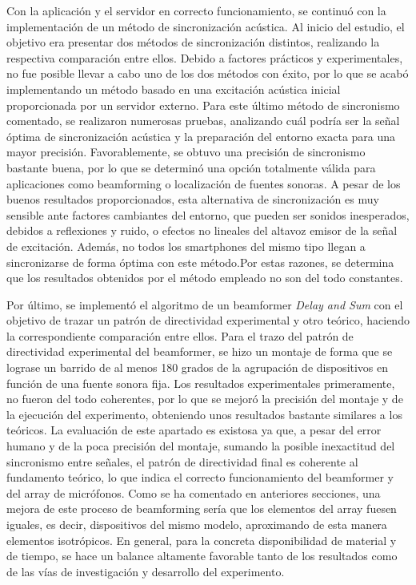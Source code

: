 \documentclass[a4paper,11pt]{book}
\begin{document}
Con la aplicación y el servidor en correcto funcionamiento, se continuó con la implementación de un método de sincronización acústica. Al inicio del estudio, el objetivo era presentar dos métodos de sincronización distintos, realizando la respectiva comparación entre ellos. Debido a factores prácticos y experimentales, no fue posible llevar a cabo uno de los dos métodos con éxito, por lo que se acabó implementando un método basado en una excitación acústica inicial proporcionada por un servidor externo. Para este último método de sincronismo comentado, se realizaron numerosas pruebas, analizando cuál podría ser la señal óptima de sincronización acústica y la preparación del entorno exacta para una mayor precisión. Favorablemente, se obtuvo una precisión de sincronismo bastante buena, por lo que se determinó una opción totalmente válida para aplicaciones como beamforming o localización de fuentes sonoras. A pesar de los buenos resultados proporcionados, esta alternativa de sincronización es muy sensible ante factores cambiantes del entorno, que pueden ser sonidos inesperados, debidos a reflexiones y ruido, o efectos no lineales del altavoz emisor de la señal de excitación. Además, no todos los smartphones del mismo tipo llegan a sincronizarse de forma óptima con este método.Por estas razones, se determina que los resultados obtenidos por el método empleado no son del todo constantes.

Por último, se implementó el algoritmo de un beamformer \textit{Delay and Sum} con el objetivo de trazar un patrón de directividad experimental y otro teórico, haciendo la correspondiente comparación entre ellos. Para el trazo del patrón de directividad experimental del beamformer, se hizo un montaje de forma que se lograse un barrido de al menos 180 grados de la agrupación de dispositivos en función de una fuente sonora fija. Los resultados experimentales primeramente, no fueron del todo coherentes, por lo que se mejoró la precisión del montaje y de la ejecución del experimento, obteniendo unos resultados bastante similares a los teóricos. La evaluación de este apartado es existosa ya que, a pesar del error humano y de la poca precisión del montaje, sumando la posible inexactitud del sincronismo entre señales, el patrón de directividad final es coherente al fundamento teórico, lo que indica el correcto funcionamiento del beamformer y del array de micrófonos. Como se ha comentado en anteriores secciones, una mejora de este proceso de beamforming sería que los elementos del array fuesen iguales, es decir, dispositivos del mismo modelo, aproximando de esta manera elementos isotrópicos. En general, para la concreta disponibilidad de material y de tiempo, se hace un balance altamente favorable tanto de los resultados como de las vías de investigación y desarrollo del experimento.
\end{document}
